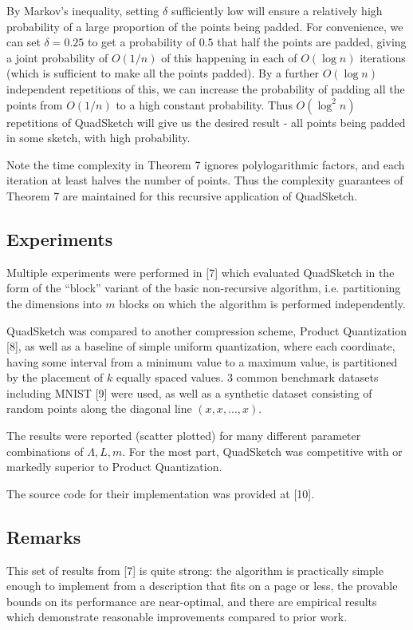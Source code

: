 \documentclass{article}
\begin{document}
By Markov's inequality, setting $\delta$ sufficiently low will ensure a relatively
high probability of a large proportion of the points being padded. For
convenience, we can set $\delta = 0.25$ to get a probability of $0.5$ that half the
points are padded, giving a joint probability of $O(1/n)$ of this happening in
each of $O(\log n)$ iterations (which is sufficient to make all the points
padded). By a further $O(\log n)$ independent repetitions of this, we can
increase the probability of padding all the points from $O(1/n)$ to a high
constant probability. Thus $O(\log^2 n)$ repetitions of QuadSketch will give us
the desired result - all points being padded in some sketch, with high
probability.

Note the time complexity in Theorem 7 ignores polylogarithmic factors, and each
iteration at least halves the number of points. Thus the complexity guarantees
of Theorem 7 are maintained for this recursive application of QuadSketch.

\subsection{Experiments}

Multiple experiments were performed in [7] which evaluated QuadSketch in the
form of the ``block'' variant of the basic non-recursive algorithm, i.e.
partitioning the dimensions into $m$ blocks on which the algorithm is performed
independently.

QuadSketch was compared to another compression scheme, Product Quantization [8],
as well as a baseline of simple uniform quantization, where each coordinate,
having some interval from a minimum value to a maximum value, is partitioned by
the placement of $k$ equally spaced values. 3 common benchmark datasets
including MNIST [9] were used, as well as a synthetic dataset consisting of
random points along the diagonal line $(x,x,...,x)$.

The results were reported (scatter plotted) for many different parameter
combinations of $\Lambda, L, m$. For the most part, QuadSketch was competitive with or
markedly superior to Product Quantization.

The source code for their implementation was provided at [10].

\subsection{Remarks}

This set of results from [7] is quite strong: the algorithm is practically
simple enough to implement from a description that fits on a page or less, the
provable bounds on its performance are near-optimal, and there are empirical
results which demonstrate reasonable improvements compared to prior work.
\end{document}
